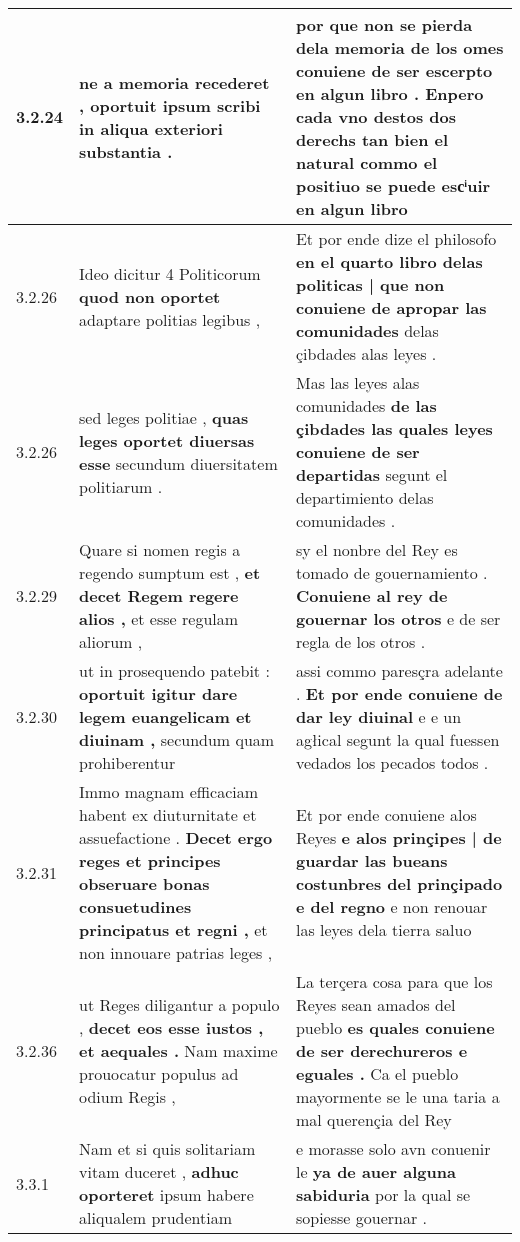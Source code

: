 \begin{tabular}{|p{1cm}|p{6.5cm}|p{6.5cm}|}
3.2.24 & ne a memoria recederet , \textbf{ oportuit ipsum scribi } in aliqua exteriori substantia . & por que non se pierda dela memoria de los omes \textbf{ conuiene de ser escerpto en algun libro . } Enpero cada vno destos dos derechs tan bien el natural commo el positiuo se puede escͥuir en algun libro \\\hline
3.2.26 & Ideo dicitur 4 Politicorum \textbf{ quod non oportet } adaptare politias legibus , & Et por ende dize el philosofo \textbf{ en el quarto libro delas politicas | que non conuiene de apropar las comunidades } delas çibdades alas leyes . \\\hline
3.2.26 & sed leges politiae , \textbf{ quas leges oportet diuersas esse } secundum diuersitatem politiarum . & Mas las leyes alas comunidades \textbf{ de las çibdades las quales leyes conuiene de ser departidas } segunt el departimiento delas comunidades . \\\hline
3.2.29 & Quare si nomen regis a regendo sumptum est , \textbf{ et decet Regem regere alios , } et esse regulam aliorum , & sy el nonbre del Rey es tomado de gouernamiento . \textbf{ Conuiene al rey de gouernar los otros } e de ser regla de los otros . \\\hline
3.2.30 & ut in prosequendo patebit : \textbf{ oportuit igitur dare legem euangelicam et diuinam , } secundum quam prohiberentur & assi commo paresçra adelante . \textbf{ Et por ende conuiene de dar ley diuinal } e e un agłical segunt la qual fuessen vedados los pecados todos . \\\hline
3.2.31 & Immo magnam efficaciam habent ex diuturnitate et assuefactione . \textbf{ Decet ergo reges et principes obseruare bonas consuetudines principatus et regni , } et non innouare patrias leges , & Et por ende conuiene alos Reyes \textbf{ e alos prinçipes | de guardar las bueans costunbres del prinçipado e del regno } e non renouar las leyes dela tierra saluo \\\hline
3.2.36 & ut Reges diligantur a populo , \textbf{ decet eos esse iustos , et aequales . } Nam maxime prouocatur populus ad odium Regis , & La terçera cosa para que los Reyes sean amados del pueblo \textbf{ es quales conuiene de ser derechureros e eguales . } Ca el pueblo mayormente se le una taria a mal querençia del Rey \\\hline
3.3.1 & Nam et si quis solitariam vitam duceret , \textbf{ adhuc oporteret } ipsum habere aliqualem prudentiam & e morasse solo avn conuenir le \textbf{ ya de auer alguna sabiduria } por la qual se sopiesse gouernar . \\\hline

\end{tabular}
